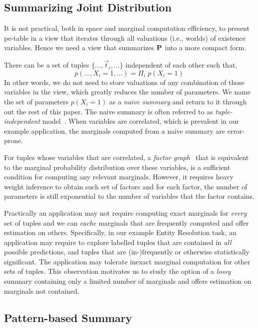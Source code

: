 \subsection{Summarizing Joint Distribution}
It is not practical, both in space and marginal computation efficiency, to present pe-table in a view that iterates through all valuations (i.e., worlds) of existence variables.
Hence we need a view that summarizes $\mathbf{P}$ into a more compact form.

There can be a set of tuples $\{\ldots,\vec t_i,\ldots\}$ independent of each other such that, 
$$p(\ldots,X_i=1,\ldots)=\Pi_i\;p(X_i=1)$$
In other words, we do not need to store valuations of any combination of those variables in the view, which greatly reduces the number of parameters.
We name the set of parameters $p(X_i=1)$ as a \emph{naive summary} and return to it through out the rest of this paper.
The naive summary is often referred to as \emph{tuple-independent} model~\cite{suciu2009probabilistic}.
When variables are correlated, which is prevalent in our example application, the marginals computed from a naive summary are error-prone.

For tuples whose variables that are correlated, a \emph{factor graph}~\cite{friedman1999learning} that is equivalent to the marginal probability distribution over these variables, is a sufficient condition for computing any relevant marginals. 
However, it requires heavy weight inference to obtain such set of factors and for each factor, the number of parameters is still exponential to the number of variables that the factor contains.

Practically an application may not require computing exact marginals for \emph{every} set of tuples and we can \emph{cache} marginals that are frequently computed and offer estimation on others. 
Specifically, in our example Entity Resolution task, an application may require to explore labelled tuples that are contained in \emph{all} possible predictions, and tuples that are (in-)frequently or otherwise statistically significant.
The application may tolerate inexact marginal computation for other sets of tuples. 
This observation motivates us to study the option of a \emph{lossy} summary containing only a limited number of marginals and offers estimation on marginals not contained.

\subsection{Pattern-based Summary}

